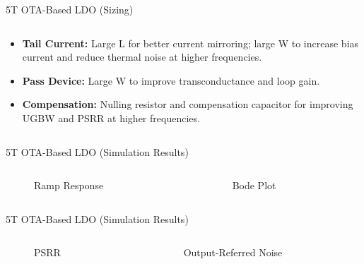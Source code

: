 \documentclass[10pt, aspectratio=169]{beamer}
\newcommand{\svg}[3]{
    \begin{figure}
        \centering
        
        \caption{#2}
    \end{figure}
}
\begin{document}
\begin{frame}{5T OTA-Based LDO (Sizing)}
\begin{columns}[T,onlytextwidth]
\begin{column}{0.6\textwidth}
\begin{itemize}
                \item \textbf{Tail Current:} Large L for better current mirroring; large W to increase bias current and reduce thermal noise at higher frequencies.
                \item \textbf{Pass Device:} Large W to improve transconductance and loop gain.
                \item \textbf{Compensation:} Nulling resistor and compensation capacitor for improving UGBW and PSRR at higher frequencies.
            \end{itemize}
        \end{column}
    \end{columns}
\end{frame}

\begin{frame}{5T OTA-Based LDO (Simulation Results)}
    \begin{columns}[c,onlytextwidth]
        \begin{column}{0.48\textwidth}
            \svg{../simulations/images/5t_tran.svg}{Ramp Response}{1}
        \end{column}
        \begin{column}{0.48\textwidth}
            \svg{../simulations/images/5t_bode.svg}{Bode Plot}{1}
        \end{column}
    \end{columns}
\end{frame}

\begin{frame}{5T OTA-Based LDO (Simulation Results)}
    \begin{columns}[c,onlytextwidth]
        \begin{column}{0.48\textwidth}
            \svg{../simulations/images/5t_psrr.svg}{PSRR}{1}
        \end{column}
        \begin{column}{0.48\textwidth}
            \svg{../simulations/images/5t_noise.svg}{Output-Referred Noise}{1}
        \end{column}
    \end{columns}
\end{frame}
\end{document}
